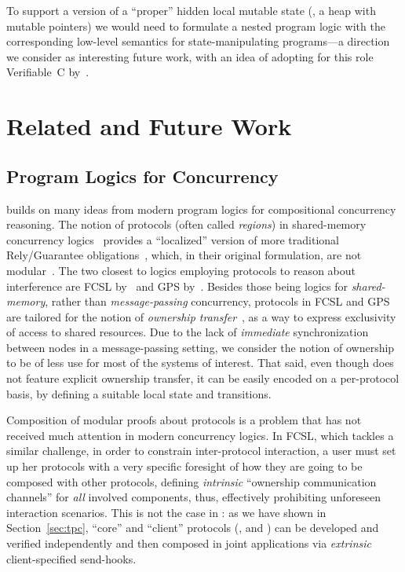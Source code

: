 To support a version of a ``proper'' hidden local mutable state (\ie,
a heap with mutable pointers) we would need to formulate a nested
program logic with the corresponding low-level semantics for
state-manipulating programs---a direction we consider as interesting
future work, with an idea of adopting for this role Verifiable~C
by~\citet{Appel-al:BOOK14}.


\section{Related and Future Work}
\label{sec:related}

\subsection{Program Logics for Concurrency}

\disel builds on many ideas from modern program logics for
compositional concurrency reasoning.
%
The notion of protocols (often called \emph{regions}) in shared-memory
concurrency
logics~\cite{Turon-al:POPL13,DinsdaleYoung-al:ECOOP10,Nanevski-al:ESOP14,Turon-al:OOPSLA14,Raad-al:ESOP15,Svendsen-Birkedal:ESOP14}
provides a ``localized'' version of more traditional Rely/Guarantee
obligations~\cite{Jones:TOPLAS83}, which, in their original
formulation, are not
modular~\cite{Vafeiadis-Parkinson:CONCUR07,Feng:POPL09,Feng-al:ESOP07}.
%
The two closest to \disel logics employing protocols to reason about
interference are FCSL by~\citet{Nanevski-al:ESOP14} and GPS
by~\citet{Turon-al:OOPSLA14}. Besides those being logics for
\emph{shared-memory}, rather than \emph{message-passing} concurrency,
protocols in FCSL and GPS are tailored for the notion of
\emph{ownership transfer}~\cite{OHearn:TCS07}, as a way to express
exclusivity of access to shared resources.
%
Due to the lack of \emph{immediate} synchronization between nodes in a
message-passing setting, we consider the notion of ownership to be of
less use for most of the systems of interest. That said, even though
\disel does not feature explicit ownership transfer, it can be easily
encoded on a per-protocol basis, by defining a suitable local state
and transitions.

Composition of modular proofs about protocols is a problem that has
not received much attention in modern concurrency logics. In FCSL,
which tackles a similar challenge, in order to constrain
inter-protocol interaction, a user must set up her protocols with a
very specific foresight of how they are going to be composed with
other protocols, defining \emph{intrinsic} ``ownership communication
channels'' for \emph{all} involved components, thus, effectively
prohibiting unforeseen interaction scenarios. This is not the case in
\disel: as we have shown in Section~\ref{sec:tpc}, ``core'' and
``client'' protocols (\eg,  and ) can be
developed and verified independently and then composed in joint
applications via \emph{extrinsic} client-specified send-hooks.

